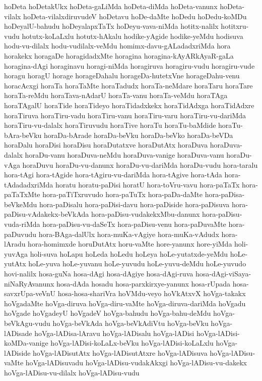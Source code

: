 {hoDeta
hoDetakUkx
hoDeta-gaLiMda
hoDeta-diMda
hoDeta-vanunx
hoDeta-vilalx
hoDeta-vilalxdiruvudeV
hoDetavu
hoDe-daMte
hoDedu
hoDedu-koMDu
hoDeyalU-bahudu
hoDeyalapxTaTx
hoDeyu-vava-niMda
hotitx-nalilx
hotitxru-vudu
hotutx-koLaLxlu
hotutx-hAkalu
hodike-yAgide
hodike-yeMdu
hodisuva
hodu-vu-dilalx
hodu-vudilalx-veMdu
homimx-davu-gALadadxriMda
hora
horakekx
horagaDe
horagidadxMte
horagina
horagina-kAyARkAyaR-gaLa
horagina-dAgi
horaginavu
horagi-niMda
horagiruva
horagiru-vudu
horagiru-vude
horagu
horagU
horage
horageDahalu
horageDa-hutetxVne
horageDahu-venu
horacAcxgi
horaTa
horaTaMte
horaTadudx
horaTa-neMdare
horaTaru
horaTare
horaTa-reMdu
horaTava-nAdarU
horaTa-vanu
horaTa-veMdu
horaTAga
horaTAgalU
horaTide
horaTideyo
horaTidadxkekx
horaTidAdxga
horaTidAdxre
horaTiruva
horaTiru-vadu
horaTiru-vanu
horaTiru-varu
horaTiru-vu-dariMda
horaTiru-vu-dalalx
horaTiruvudu
horaTive
horaTu
horaTu-baMdide
horaTu-bAra-beVku
horaDa-bArade
horaDa-beVku
horaDa-beVko
horaDa-beVDa
horaDalu
horaDisi
horaDisu
horaDutatxve
horaDutAtx
horaDuva
horaDuva-dalalx
horaDu-vanu
horaDuva-neMdu
horaDuva-vanige
horaDuva-vanu
horaDu-vAga
horaDuvu
horaDu-vu-danunx
horaDu-vu-dariMda
horaDu-vudu
hora-taralu
hora-tAgi
hora-tAgide
hora-tAgiru-vu-dariMda
hora-tAgive
hora-tAda
hora-tAdadadxriMda
horatu
horatu-paDisi
horatU
hora-toVru-vavu
hora-paTaTx
hora-paTaTxMte
hora-paTiTxruvudo
hora-paTuTx
hora-paDa-daMte
hora-paDisa-beVkeMdu
hora-paDisalu
hora-paDisi-davu
hora-paDiside
hora-paDisuva
hora-paDisu-vAdakekx-beVkAda
hora-paDisu-vudakekxMbu-danunx
hora-paDisu-vuda-riMda
hora-paDisu-vu-daSeTx
hora-paDisu-venu
hora-paDuvaMte
hora-paDuvudu
hora-BAga-dalUlx
hora-muKa-vAgiye
hora-muKa-vAdudx
hora-lAradu
hora-homimxde
horuDutAtx
horu-vaMte
hore-yanunx
hore-yiMda
holi-yuvAga
holi-suva
hoLapu
hoLeda
hoLedu
hoLeya
hoLe-yutatxde-yeMdu
hoLe-yutAtx
hoLe-yuva
hoLe-yuvanu
hoLe-yuvudu
hoLe-yuvu-deMdu
hoLe-yuvudo
hovi-nalilx
hosa-guNa
hosa-dAgi
hosa-dAgiye
hosa-dAgi-ruva
hosa-dAgi-viSaya-niNaRyAvanunx
hosa-dAda
hosadu
hosa-parxkirxye-yanunx
hosa-rUpada
hosa-savxrUpa-veVnU
hosa-hosa-shariVra
hoVMdu-veyo
hoVkAtxvX
hoVga-takakx
hoVgadaMte
hoVga-diruva
hoVga-diru-vaMte
hoVga-diruva-dariMda
hoVgadu
hoVgade
hoVgadeyU
hoVgadeV
hoVga-bahudu
hoVga-bahu-deMdu
hoVga-beVkAgu-vudu
hoVga-beVkAda
hoVga-beVkAdiVtu
hoVga-beVku
hoVga-lADisade
hoVga-lADisa-lAravu
hoVga-lADisalu
hoVga-lADisi
hoVga-lADisi-koMDa-vanige
hoVga-lADisi-koLaLx-beVku
hoVga-lADisi-koLaLxlu
hoVga-lADiside
hoVga-lADisutAtx
hoVga-lADisutAtxre
hoVga-lADisuva
hoVga-lADisu-vaMte
hoVga-lADisuvadu
hoVga-lADisu-vudakAkxgi
hoVga-lADisu-vu-dakekx
hoVga-lADisu-vu-dilalx
hoVga-lADisu-vudu
}
